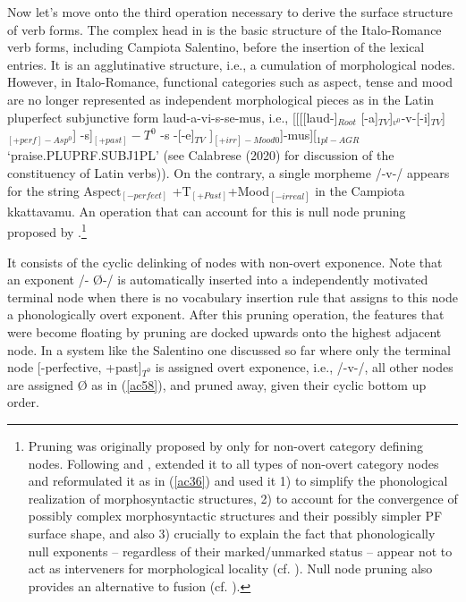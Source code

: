 \documentclass[output=paper]{langscibook}
\begin{document}
Now let's move onto the third operation necessary to derive the surface structure of verb forms. The complex head in   is the basic structure of the Italo-Romance verb forms, including Campiota Salentino, before the insertion of the lexical entries. It is an agglutinative structure, i.e., a cumulation of morphological nodes. However, in Italo-Romance, functional categories such as aspect, tense and mood are no longer represented as independent morphological pieces as in the Latin pluperfect subjunctive form laud-a-vi-s-se-mus, i.e., [[[[laud-]$_{Root}$ [-a]$_{TV}$]$_{v^0}$-v-[-i]$_{TV}$]$_{[+perf]-Asp^0}$] -s]$_{[+past]}-T^0$  -s -[-e]$_{TV}$ ]$_{[+irr]-Mood0}$]-mus][$_{1pl-AGR}$  ‘praise.PLUPRF.SUBJ1PL’ (see Calabrese (2020) for discussion of the constituency of Latin verbs)). On the contrary, a single morpheme /-v-/ appears for the string Aspect$_{[-perfect]}$ +T$_{[+Past]}$+Mood$_{[-irreal]}$ in the Campiota kkattavamu.  An operation that can account for this is null node pruning proposed by \cite{calabrese2019a}.\footnote{Pruning was originally proposed by \cite{embick2010a} only for non-overt category defining nodes. Following \cite{christopoulos2017a} and \cite{christopoulos2018a}, \cite{calabrese2019a} extended it to all types of non-overt category nodes and reformulated it as in (\ref{ac36}) and used it 1) to simplify the phonological realization of morphosyntactic structures, 2) to account for the convergence of possibly complex morphosyntactic structures and their possibly simpler PF surface shape, and also 3) crucially to explain the fact that phonologically null exponents -- regardless of their marked/unmarked status --  appear not to act as interveners for morphological locality (cf. \cite{embick2010a, calabrese2019a}). Null node pruning also provides an alternative to fusion (cf. \cite{halle1993a}).}
 
It consists of the cyclic delinking of nodes with non-overt exponence. Note that an exponent /- Ø-/ is automatically  inserted  into a independently motivated  terminal node when there is no vocabulary insertion rule that assigns to this node a phonologically overt exponent.  After this pruning operation, the features that were become floating by pruning are docked upwards onto the highest adjacent node.  In a system like the Salentino one discussed so far where only the terminal node [-perfective, +past]$_{T^0}$ is assigned overt exponence, i.e., /-v-/, all other nodes are assigned Ø as in (\ref{ac58}), and pruned away, given their cyclic bottom up order.
\end{document}
